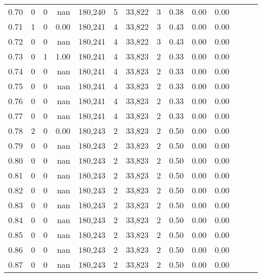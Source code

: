 \begin{tabular}{rrrrrrrrrrrrrr}
0.70 &       0 &      0 &   nan &  180,240 &        5 &  33,822 &       3 &  0.38 &  0.00 &      0.00 \\
0.71 &       1 &      0 &  0.00 &  180,241 &        4 &  33,822 &       3 &  0.43 &  0.00 &      0.00 \\
0.72 &       0 &      0 &   nan &  180,241 &        4 &  33,822 &       3 &  0.43 &  0.00 &      0.00 \\
0.73 &       0 &      1 &  1.00 &  180,241 &        4 &  33,823 &       2 &  0.33 &  0.00 &      0.00 \\
0.74 &       0 &      0 &   nan &  180,241 &        4 &  33,823 &       2 &  0.33 &  0.00 &      0.00 \\
0.75 &       0 &      0 &   nan &  180,241 &        4 &  33,823 &       2 &  0.33 &  0.00 &      0.00 \\
0.76 &       0 &      0 &   nan &  180,241 &        4 &  33,823 &       2 &  0.33 &  0.00 &      0.00 \\
0.77 &       0 &      0 &   nan &  180,241 &        4 &  33,823 &       2 &  0.33 &  0.00 &      0.00 \\
0.78 &       2 &      0 &  0.00 &  180,243 &        2 &  33,823 &       2 &  0.50 &  0.00 &      0.00 \\
0.79 &       0 &      0 &   nan &  180,243 &        2 &  33,823 &       2 &  0.50 &  0.00 &      0.00 \\
0.80 &       0 &      0 &   nan &  180,243 &        2 &  33,823 &       2 &  0.50 &  0.00 &      0.00 \\
0.81 &       0 &      0 &   nan &  180,243 &        2 &  33,823 &       2 &  0.50 &  0.00 &      0.00 \\
0.82 &       0 &      0 &   nan &  180,243 &        2 &  33,823 &       2 &  0.50 &  0.00 &      0.00 \\
0.83 &       0 &      0 &   nan &  180,243 &        2 &  33,823 &       2 &  0.50 &  0.00 &      0.00 \\
0.84 &       0 &      0 &   nan &  180,243 &        2 &  33,823 &       2 &  0.50 &  0.00 &      0.00 \\
0.85 &       0 &      0 &   nan &  180,243 &        2 &  33,823 &       2 &  0.50 &  0.00 &      0.00 \\
0.86 &       0 &      0 &   nan &  180,243 &        2 &  33,823 &       2 &  0.50 &  0.00 &      0.00 \\
0.87 &       0 &      0 &   nan &  180,243 &        2 &  33,823 &       2 &  0.50 &  0.00 &      0.00 \\

\end{tabular}
